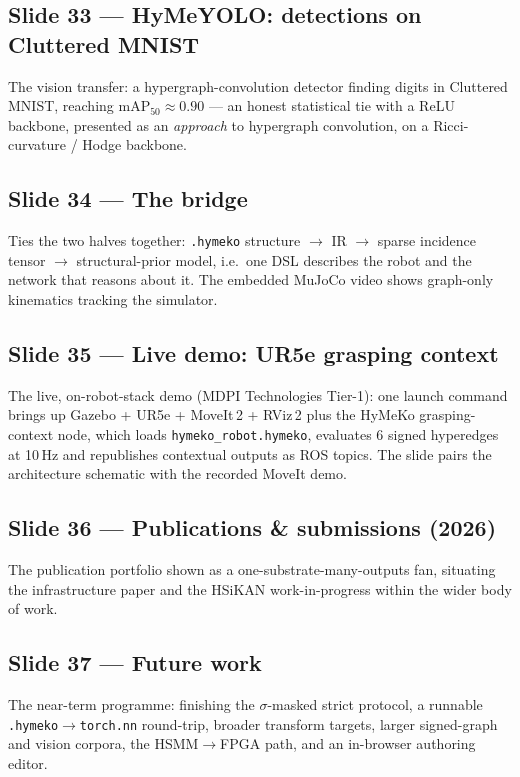 \documentclass[10pt]{article}
\begin{document}
\subsection*{Slide 33 --- HyMeYOLO: detections on Cluttered MNIST}
The vision transfer: a hypergraph-convolution detector finding digits in Cluttered MNIST, reaching mAP$_{50}\approx0.90$ --- an honest statistical tie with a ReLU backbone, presented as an \emph{approach} to hypergraph convolution, on a Ricci-curvature / Hodge backbone.

\subsection*{Slide 34 --- The bridge}
Ties the two halves together: \texttt{.hymeko} structure $\to$ IR $\to$ sparse incidence tensor $\to$ structural-prior model, i.e.\ one DSL describes the robot and the network that reasons about it. The embedded MuJoCo video shows graph-only kinematics tracking the simulator.

\subsection*{Slide 35 --- Live demo: UR5e grasping context}
The live, on-robot-stack demo (MDPI Technologies Tier-1): one launch command brings up Gazebo + UR5e + MoveIt\,2 + RViz\,2 plus the HyMeKo grasping-context node, which loads \texttt{hymeko\_robot.hymeko}, evaluates 6 signed hyperedges at 10\,Hz and republishes contextual outputs as ROS topics. The slide pairs the architecture schematic with the recorded MoveIt demo.

\subsection*{Slide 36 --- Publications \& submissions (2026)}
The publication portfolio shown as a one-substrate-many-outputs fan, situating the infrastructure paper and the HSiKAN work-in-progress within the wider body of work.

\subsection*{Slide 37 --- Future work}
The near-term programme: finishing the $\sigma$-masked strict protocol, a runnable \texttt{.hymeko}$\to$\texttt{torch.nn} round-trip, broader transform targets, larger signed-graph and vision corpora, the HSMM$\to$FPGA path, and an in-browser authoring editor.
\end{document}

